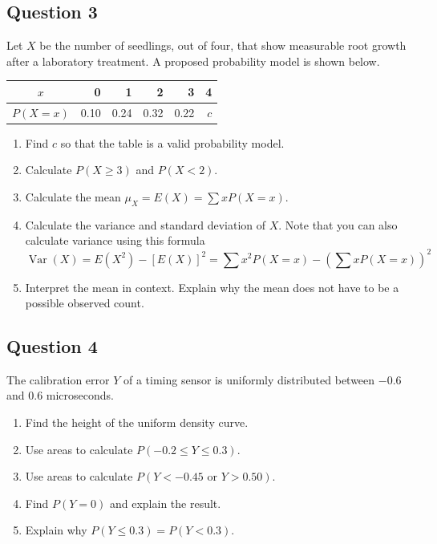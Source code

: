 \documentclass[10pt,letterpaper]{article}
\newcommand{\questionheading}[1]{%
  \subsection*{Question #1}
}
\begin{document}
\questionheading{3}
Let $X$ be the number of seedlings, out of four, that show measurable root growth after a laboratory treatment. A proposed probability model is shown below.
\begin{center}
\begin{tabular}{c*{5}{r}}
\toprule
$x$ & 0 & 1 & 2 & 3 & 4 \\
\midrule
$P(X=x)$ & 0.10 & 0.24 & 0.32 & 0.22 & $c$ \\
\bottomrule
\end{tabular}
\end{center}
\begin{enumerate}
	\item Find $c$ so that the table is a valid probability model.
	\item Calculate $P(X\geq 3)$ and $P(X<2)$.
	\item Calculate the mean $\mu_X=E(X) = \sum xP(X=x)$.
	\item Calculate the variance and standard deviation of $X$. Note that you can also calculate variance using this formula
	$$\operatorname{Var}(X)=E(X^2)-[E(X)]^2 = \sum x^2P(X=x) - \left(\sum xP(X=x) \right)^2$$
	\item Interpret the mean in context. Explain why the mean does not have to be a possible observed count.
\end{enumerate}

\newpage 

\questionheading{4}
The calibration error $Y$ of a timing sensor is uniformly distributed between $-0.6$ and $0.6$ microseconds.
\begin{enumerate}
	\item Find the height of the uniform density curve.
	\item Use areas to calculate $P(-0.2\leq Y\leq 0.3)$.
	\item Use areas to calculate $P(Y<-0.45\text{ or }Y>0.50)$.
	\item Find $P(Y=0)$ and explain the result.
	\item Explain why $P(Y\leq0.3)=P(Y<0.3)$.
	\end{enumerate}
\end{document}
